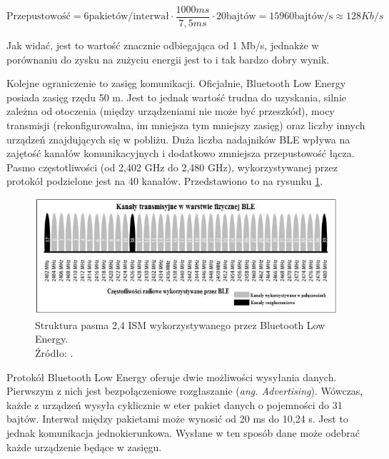 \begin{equation}
	\text{Przepustowość} = 6 \text{pakietów/interwał} \cdot \frac{1000ms}{7,5ms} \cdot 20 \text{bajtów} = 15960 \text{bajtów/s} \approx 128 Kb/s
\end{equation}

Jak widać, jest to wartość znacznie odbiegająca od 1 Mb/s, jednakże w porównaniu do zysku na zużyciu energii jest to i tak bardzo dobry wynik. 

Kolejne ograniczenie to zasięg komunikacji. Oficjalnie, Bluetooth Low Energy posiada zasięg rzędu 50 m. Jest to jednak wartość trudna do uzyskania, silnie zależna od otoczenia (między urządzeniami nie może być przeszkód), mocy transmisji (rekonfigurowalna, im mniejsza tym mniejszy zasięg) oraz liczby innych urządzeń znajdujących się w pobliżu. Duża liczba nadajników BLE wpływa na zajętość kanałów komunikacyjnych i dodatkowo zmniejsza przepustowość łącza. Pasmo częstotliwości (od 2,402 GHz do 2,480 GHz), wykorzystywanej przez protokół podzielone jest na 40 kanałów. Przedstawiono to na rysunku \ref{fig:image_ble_channels}.

\begin{figure}[H]
	\centering
	\includegraphics[width=17cm]{img/theory/BLE/ble_channels.png}
	\caption{Struktura pasma 2,4 ISM wykorzystywanego przez Bluetooth Low Energy.\\Źródło: \cite{inzynierka}.}
	\label{fig:image_ble_channels}
\end{figure}

Protokół Bluetooth Low Energy oferuje dwie możliwości wysyłania danych. Pierwszym z nich jest bezpołączeniowe rozgłaszanie (\textit{ang. Advertising}). Wówczas, każde z urządzeń wysyła cyklicznie  w eter pakiet danych o pojemności do 31 bajtów. Interwał między pakietami może wynosić od 20 ms do 10,24 s. Jest to jednak komunikacja jednokierunkowa. Wysłane w ten sposób dane może odebrać każde urządzenie będące w zasięgu.

